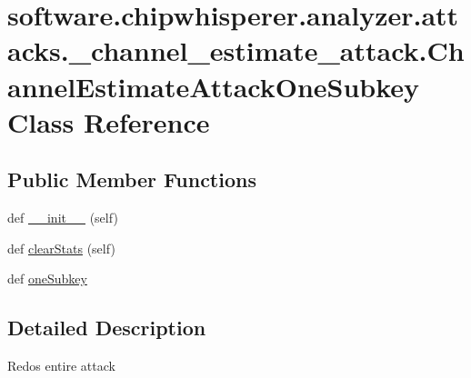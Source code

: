 \hypertarget{classsoftware_1_1chipwhisperer_1_1analyzer_1_1attacks_1_1__channel__estimate__attack_1_1ChannelEstimateAttackOneSubkey}{}\section{software.\+chipwhisperer.\+analyzer.\+attacks.\+\_\+channel\+\_\+estimate\+\_\+attack.\+Channel\+Estimate\+Attack\+One\+Subkey Class Reference}
\label{classsoftware_1_1chipwhisperer_1_1analyzer_1_1attacks_1_1__channel__estimate__attack_1_1ChannelEstimateAttackOneSubkey}
\subsection*{Public Member Functions}
\begin{DoxyCompactItemize}
\item 
def \hyperlink{classsoftware_1_1chipwhisperer_1_1analyzer_1_1attacks_1_1__channel__estimate__attack_1_1ChannelEstimateAttackOneSubkey_a38c99b4939feb6362625a5f6198c8d87}{\+\_\+\+\_\+init\+\_\+\+\_\+} (self)
\item 
def \hyperlink{classsoftware_1_1chipwhisperer_1_1analyzer_1_1attacks_1_1__channel__estimate__attack_1_1ChannelEstimateAttackOneSubkey_ad7ca035a815c08094d0170958ee369c0}{clear\+Stats} (self)
\item 
def \hyperlink{classsoftware_1_1chipwhisperer_1_1analyzer_1_1attacks_1_1__channel__estimate__attack_1_1ChannelEstimateAttackOneSubkey_abd28a324a8a0211dbe18d40c0ac61335}{one\+Subkey}
\end{DoxyCompactItemize}


\subsection{Detailed Description}
\begin{DoxyVerb}Redos entire attack \end{DoxyVerb}
 

